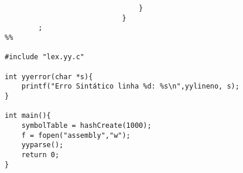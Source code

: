 \documentclass{report}
\begin{document}
\begin{verbatim}
                                }
                            }
        ;
%%

#include "lex.yy.c"

int yyerror(char *s){
    printf("Erro Sintático linha %d: %s\n",yylineno, s);
}
     
int main(){
    symbolTable = hashCreate(1000);
    f = fopen("assembly","w");
    yyparse(); 
    return 0; 
}

\end{verbatim}
\end{document}
